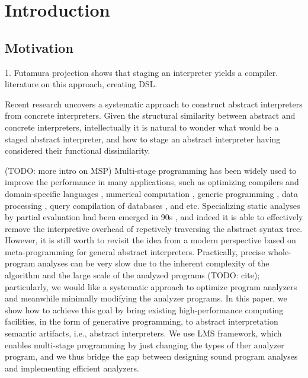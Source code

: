 \section{Introduction}

\subsection{Motivation}

1. Futamura projection \cite{Futamura1999} shows that staging an interpreter yields a compiler.
literature on this approach, creating DSL.

Recent research uncovers a systematic approach to construct abstract interpreters from concrete interpreters.
Given the structural similarity between abstract and concrete interpreters, intellectually it is natural to 
wonder what would be a staged abstract interpreter, and how to stage an abstract interpreter 
having considered their functional dissimilarity.

(TODO: more intro on MSP)
Multi-stage programming has been widely used to improve the performance in many applications, 
such as optimizing compilers and domain-specific languages \cite{DBLP:conf/pldi/RompfSBLCO14, DBLP:journals/tecs/SujeethBLRCOO14, DBLP:conf/gpce/SujeethGBLROO13, DBLP:journals/jfp/CaretteKS09},
numerical computation \cite{PGL-038, DBLP:conf/pepm/AktemurKKS13}, 
generic programming \cite{DBLP:journals/pacmpl/Yallop17}, 
data processing \cite{DBLP:conf/oopsla/JonnalageddaCSRO14, DBLP:conf/popl/KiselyovBPS17}, 
query compilation of databases \cite{DBLP:conf/osdi/EssertelTDBOR18, DBLP:conf/sigmod/TahboubER18},
and etc.
Specializing static analyses by partial evaluation had been emerged in 90s \cite{damian1999partial, amtoft1999partial, Boucher:1996:ACN:647473.727587}, 
and indeed it is able to effectively remove the interpretive overhead of repetively traversing the abstract syntax tree.
However, it is still worth to revisit the idea from a modern perspective based on meta-programming for general abstract interpreters.
Practically, precise whole-program analyses can be very slow due to the inherent complexity of the algorithm and the large scale of the analyzed programs (TODO: cite); 
particularly, we would like a systematic approach to optimize program analyzers and meanwhile minimally modifying the analyzer programs.
In this paper, we show how to achieve this goal by bring existing high-performance computing facilities, in the form of generative
programming, to abstract interpretation semantic artifacts, i.e., abstract interpreters. We use LMS framework, which enables
multi-stage programming by just changing the types of ther analyzer program, and we thus bridge the gap between designing sound 
program analyses and implementing efficient analyzers.

